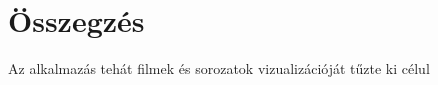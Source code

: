 \chapter{Összegzés} %
\label{ch:sum}

Az alkalmazás tehát filmek és sorozatok vizualizációját tűzte ki célul
